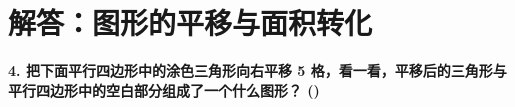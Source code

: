 

\section{解答：图形的平移与面积转化}

\vspace{0.4cm}

\noindent\textbf{4. 把下面平行四边形中的涂色三角形向右平移 5 格，看一看，平移后的三角形与平行四边形中的空白部分组成了一个什么图形？ ()}

\vspace{0.8cm}

